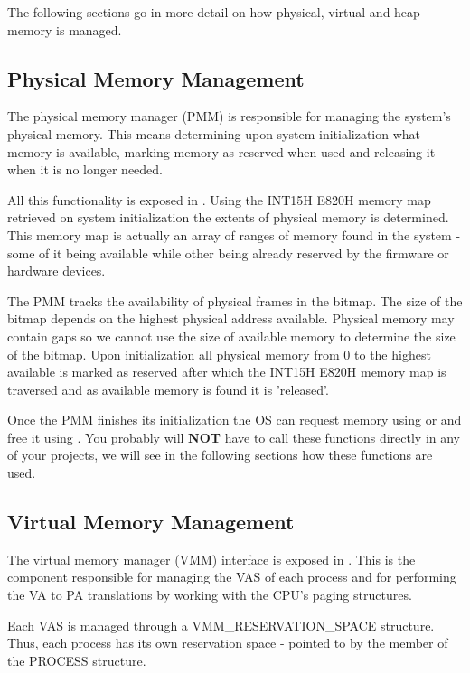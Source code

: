 \begin{appendices}
The following sections go in more detail on how physical, virtual and heap memory is managed.

\subsection{Physical Memory Management}

The physical memory manager (PMM) is responsible for managing the system's physical memory. This
means determining upon system initialization what memory is available, marking memory as reserved
when used and releasing it when it is no longer needed.

All this functionality is exposed in . Using the INT15H E820H memory map retrieved on
system initialization the extents of physical memory is determined. This memory map is actually an
array of ranges of memory found in the system - some of it being available while other being already
reserved by the firmware or hardware devices.

The PMM tracks the availability of physical frames in the  bitmap.
The size of the bitmap depends on the highest physical address available. Physical memory may 
contain gaps so we cannot use the size of available memory to determine the size of the bitmap.
Upon initialization all physical memory from 0 to the highest available is marked as reserved after
which the INT15H E820H memory map is traversed and as available memory is found it is 'released'.

Once the PMM finishes its initialization the OS can request memory using  or
 and free it using . You probably will \textbf{NOT}
have to call these functions directly in any of your projects, we will see in the following sections
how these functions are used.

\subsection{Virtual Memory Management}
\label{sect:VMM}

The virtual memory manager (VMM) interface is exposed in . This is the component
responsible for managing the VAS of each process and for performing the VA to PA translations by
working with the CPU's paging structures.

Each VAS is managed through a VMM\_RESERVATION\_SPACE structure. Thus, each process has its own
reservation space - pointed to by the  member of the PROCESS structure.


\end{appendices}
